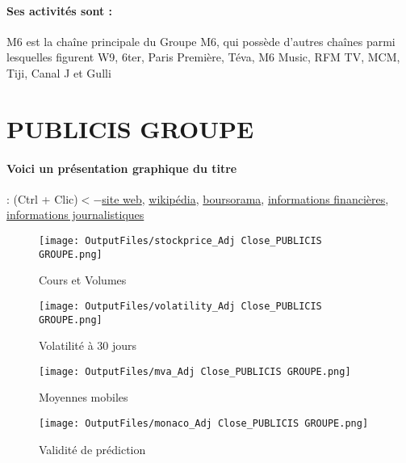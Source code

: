 \documentclass[11pt,a4paper]{report}%
\begin{document}
\paragraph{Ses activités sont : } M6 est la chaîne principale du Groupe M6, qui possède d'autres chaînes parmi lesquelles figurent W9, 6ter, Paris Première, Téva, M6 Music, RFM TV, MCM, Tiji, Canal J et Gulli 
    
    \newpage

\section{PUBLICIS GROUPE}

\paragraph{Voici un présentation graphique du titre} : (Ctrl + Clic)$<-$\href{https://www.publicisgroupe.com/fr/investisseurs/investisseurs-analystes/panorama}{site web}, \href{https://fr.wikipedia.org/wiki/Publicis_Groupe}{wikipédia}, \href{https://www.boursorama.com/cours/1rPPUB}{boursorama}, \href{https://www.qwant.com/?q=site:https:%2f%2fwww.easybourse.com%2faction-societe%2fPUBLICIS-GROUPE&t=web&client=ext-firefox-hp}{informations financières}, \href{https://bourse.lerevenu.com/cours-de-bourse/fiche-valeur-synthese/PUBLICIS-GROUPE/PUB-FR}{informations journalistiques}
\begin{figure}[!htb]
   \begin{minipage}{0.5\textwidth}
     \centering
     \texttt{[image: OutputFiles/stockprice\_Adj Close\_PUBLICIS GROUPE.png]}
     \caption{Cours et Volumes}\label{Fig:price_PUBLICIS GROUPE}
   \end{minipage}\hfill
   \begin{minipage}{0.5\textwidth}
     \centering
     \texttt{[image: OutputFiles/volatility\_Adj Close\_PUBLICIS GROUPE.png]}
     \caption{Volatilité à 30 jours}\label{Fig:volat_PUBLICIS GROUPE}
   \end{minipage}
\end{figure}
\begin{figure}[!htb]
   \begin{minipage}{0.5\textwidth}
     \centering
     \texttt{[image: OutputFiles/mva\_Adj Close\_PUBLICIS GROUPE.png]}
     \caption{Moyennes mobiles}\label{Fig:mva_PUBLICIS GROUPE}
   \end{minipage}\hfill
   \begin{minipage}{0.5\textwidth}
     \centering
     \texttt{[image: OutputFiles/monaco\_Adj Close\_PUBLICIS GROUPE.png]}
     \caption{Validité de prédiction}\label{Fig:prediction_PUBLICIS GROUPE}
   \end{minipage}
\end{figure}
\end{document}
